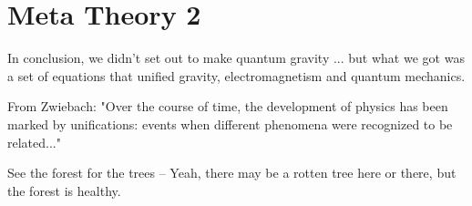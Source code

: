 \documentclass {article}
\begin{document}
\newpage

\section{Meta Theory 2}
In conclusion, we didn't set out to make quantum gravity ... but what we got was a set of equations that unified gravity, electromagnetism and quantum mechanics.

From Zwiebach: "Over the course of time, the development of physics has been marked by unifications: events when different phenomena were recognized to be related..."


See the forest for the trees -- Yeah, there may be a rotten tree here or there, but the forest is healthy.
\newpage
\end{document}
